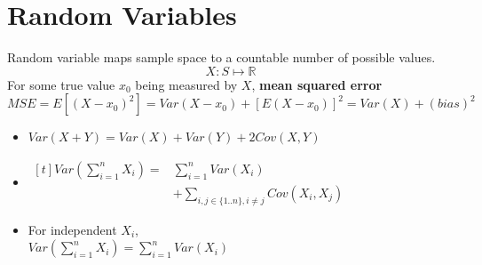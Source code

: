 \section{Random Variables}
Random variable maps sample space to a countable number of possible values.
\[X: S\mapsto\mathbb{R}\]
For some true value $x_0$ being measured by $X$, \textbf{mean squared error} $MSE=E[{(X-x_0)}^2]=Var(X-x_0)+{[E(X-x_0)]}^2=Var(X)+{(bias)}^2$
\begin{itemize}
  \item $Var(X + Y) = Var(X) + Var(Y) + 2Cov(X, Y)$ 
  \item $\begin{aligned}[t]Var\left(\sum\limits_{i=1}^n X_i\right) =& \sum\limits_{i=1}^n Var(X_i)\\
    &+ \sum\limits_{i,j\in\{1..n\}, i\neq j} Cov(X_i, X_j)\end{aligned}$
  \item For independent $X_i$,\\$Var\left(\sum\limits_{i=1}^n X_i\right) =
    \sum\limits_{i=1}^n Var (X_i)$
\end{itemize}

